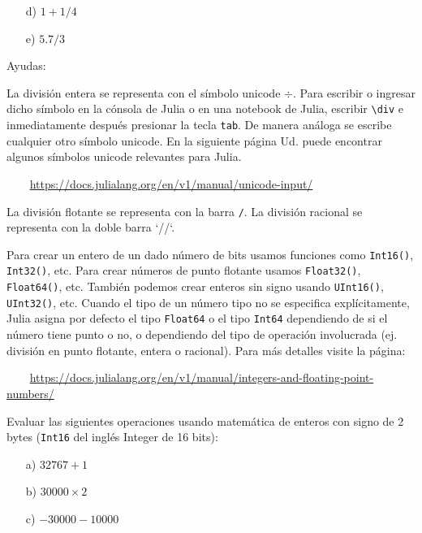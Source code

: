 \documentclass[a4paper]{article}
\newcounter{problema}
\newcommand{\prob}[1]{\vspace{0.33cm}\stepcounter{problema}
                 \noindent{\bf Ejercicio \arabic{problema}:}{\it #1}}
\begin{document}
\begin{itemize}
\item[d)]
$1 + 1/4$

\item[e)]
$5.7/3$
\end{itemize}

Ayudas:

La divisi\'on entera se representa con el s\'imbolo unicode $\div$.
Para escribir o ingresar dicho s\'imbolo en la c\'onsola de Julia o en una notebook de Julia, escribir \verb+\div+ e inmediatamente despu\'es presionar la tecla \verb+tab+.
De manera an\'aloga se escribe cualquier otro s\'imbolo unicode.
En la siguiente p\'agina Ud. puede encontrar algunos s\'imbolos unicode relevantes para Julia.

\verb+    +\href{https://docs.julialang.org/en/v1/manual/unicode-input/}
{https://docs.julialang.org/en/v1/manual/unicode-input/}

La divisi\'on flotante se representa con la barra \verb+/+.
La divisi\'on racional se representa con la doble barra `//`.

Para crear un entero de un dado n\'umero de bits usamos funciones como \verb+Int16()+, \verb+Int32()+, etc. 
Para crear n\'umeros de punto flotante usamos \verb+Float32()+, \verb+Float64()+, etc. 
Tambi\'en podemos crear enteros sin signo usando \verb+UInt16()+, \verb+UInt32()+, etc.
Cuando el tipo de un n\'umero tipo no se especifica expl\'icitamente, Julia asigna por defecto el tipo \verb+Float64+ o el tipo \verb+Int64+ dependiendo de si el n\'umero tiene punto o no, o dependiendo del tipo de operaci\'on involucrada (ej. divisi\'on en punto flotante, entera o racional).
Para m\'as detalles visite la p\'agina:

\verb+    +\href{https://docs.julialang.org/en/v1/manual/integers-and-floating-point-numbers/}
{https://docs.julialang.org/en/v1/manual/integers-and-floating-point-numbers/}

\prob{}   
Evaluar las siguientes operaciones usando matem\'atica de enteros con signo de 2 bytes (\verb+Int16+ del ingl\'es Integer de 16 bits):

\begin{itemize}
\item[a)] 
$32767 + 1$

\item[b)] 
$30000 \times 2$

\item[c)] 
$-30000-10000$
\end{itemize}
\end{document}
